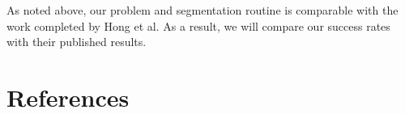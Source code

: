 \documentclass[twoside]{article}
\begin{document}
\begin{multicols}{2}
As noted above, our problem and segmentation routine is comparable with the work completed by Hong et al\cite{hong1998segmentation}. As a result, we will compare our success rates with their published results.




\section{References}

\begin{spacing}{0.9}
%
\begingroup
\renewcommand{\section}[2]{}%

\endgroup
\end{spacing}

\end{multicols}
\end{document}
